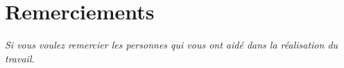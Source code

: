 \part*{Remerciements}
\emph{Si vous voulez remercier les personnes qui vous ont aidé dans la réalisation du travail.}
